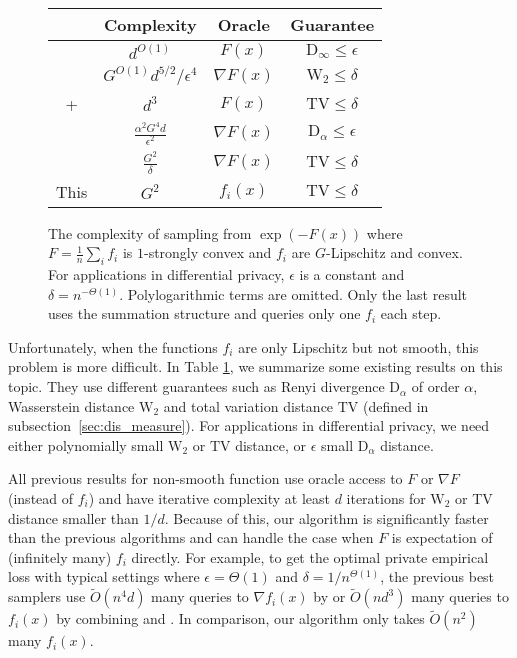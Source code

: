 \begin{center}
\begin{figure}[ht]
\begin{centering}
\begin{tabular}{|c|c|c|c|}
\hline 
 & Complexity & Oracle & Guarantee\tabularnewline
\hline 
\hline 
\cite{BST14} & $d^{O(1)}$ & $F(x)$ & $\mathrm{D}_{\infty}\leq\epsilon$\tabularnewline
\hline 
\cite{CDJB20} & $G^{O(1)}d^{5/2}/\epsilon^{4}$ & $\nabla F(x)$ & $\mathrm{W}_{2}\leq\delta$\tabularnewline
\hline 
\cite{JLLV21} + \cite{C21} & $d^{3}$ & $F(x)$ & $\mathrm{TV}\leq\delta$\tabularnewline
\hline 
\cite{GT20}& $\frac{\alpha^{2}G^{4}d}{\epsilon^{2}}$ & $\nabla F(x)$ & $\mathrm{D}_{\alpha}\leq\epsilon$\tabularnewline
\hline 
\cite{LC21} & $\frac{G^{2}}{\delta}$ & $\nabla F(x)$ & $\mathrm{TV}\leq\delta$\tabularnewline
\hline 
This & $G^{2}$ & $f_{i}(x)$ & $\mathrm{TV}\leq\delta$\tabularnewline
\hline 
\end{tabular}
\par\end{centering}
\caption{The complexity of sampling from $\exp(-F(x))$ where $F=\frac{1}{n}\sum_{i}f_{i}$
is $1$-strongly convex and $f_{i}$ are $G$-Lipschitz and convex.
For applications in differential privacy, $\epsilon$ is a constant
and $\delta=n^{-\Theta(1)}$. Polylogarithmic terms are omitted. Only the last result uses the summation structure and queries only one $f_{i}$ each step. \label{fig:sample_runtime}}
\end{figure}
\vspace{-7mm}
\par\end{center}

Unfortunately, when the functions $f_i$ are only Lipschitz but not smooth, this problem is more difficult.
In Table \ref{fig:sample_runtime}, we summarize some existing results on this topic. They use different guarantees such as Renyi divergence $\mathrm{D}_{\alpha}$ of order $\alpha$, Wasserstein distance $\mathrm{W}_{2}$ and total variation distance $\mathrm{TV}$ (defined in subsection~\ref{sec:dis_measure}). For applications in differential privacy, we need either polynomially small $\mathrm{W}_{2}$ or $\mathrm{TV}$ distance, or $\epsilon$ small $\mathrm{D}_{\alpha}$ distance. 


All previous results for non-smooth function use oracle access to $F$ or $\nabla F$ (instead of $f_i$) and have iterative complexity at least $d$ iterations for $\mathrm{W}_{2}$ or TV distance smaller than $1/d$. Because of this, our algorithm is significantly faster than
the previous algorithms and can handle the case when $F$ is expectation of (infinitely many)  $f_i$ directly.
For example, to get the optimal private empirical loss with typical settings where $\epsilon=\Theta(1)$
and $\delta=1/n^{\Theta(1)}$, the previous best samplers use $\widetilde{O}(n^{4}d)$ many queries to $\nabla f_{i}(x)$ by \cite{GT20} or $\widetilde{O}(nd^{3})$
many queries to $f_{i}(x)$ by combining \cite{JLLV21} and \cite{C21}. 
In comparison, our algorithm only takes $\widetilde{O}(n^{2})$
many $f_{i}(x)$. 

